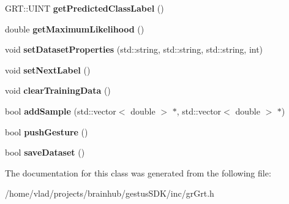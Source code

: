 \begin{DoxyCompactItemize}
G\+R\+T\+::\+U\+I\+NT {\bfseries get\+Predicted\+Class\+Label} ()
\item 
\mbox{\label{classGRGrt_ae8d858e1ffb1c1bebed87998bb0d094f}} 
double {\bfseries get\+Maximum\+Likelihood} ()
\item 
\mbox{\label{classGRGrt_a6e6807059279def6202e89904fe2704e}} 
void {\bfseries set\+Dataset\+Properties} (std\+::string, std\+::string, std\+::string, int)
\item 
\mbox{\label{classGRGrt_adca61031b452e7a1105a8755322c7120}} 
void {\bfseries set\+Next\+Label} ()
\item 
\mbox{\label{classGRGrt_a29bc0a4af10d5a97022c020e69ae14c9}} 
void {\bfseries clear\+Training\+Data} ()
\item 
\mbox{\label{classGRGrt_afbd9af81bc8115a14ad069760c4812ce}} 
bool {\bfseries add\+Sample} (std\+::vector$<$ double $>$ $\ast$, std\+::vector$<$ double $>$ $\ast$)
\item 
\mbox{\label{classGRGrt_ae8b794a630026859046d207d11e9c278}} 
bool {\bfseries push\+Gesture} ()
\item 
\mbox{\label{classGRGrt_a32cc6ef6833fe314702451731a8aee10}} 
bool {\bfseries save\+Dataset} ()
\end{DoxyCompactItemize}


The documentation for this class was generated from the following file\+:\begin{DoxyCompactItemize}
\item 
/home/vlad/projects/brainhub/gestus\+S\+D\+K/inc/gr\+Grt.\+h\end{DoxyCompactItemize}
